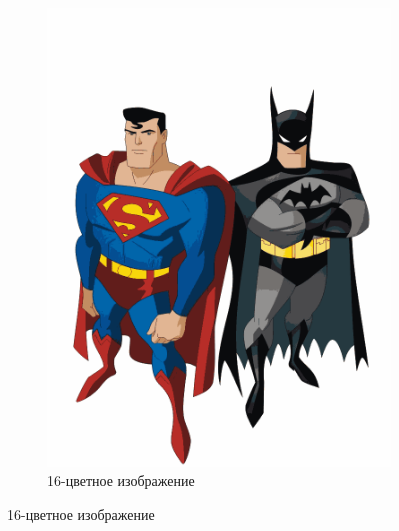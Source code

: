 \documentclass[a4paper,12pt]{article}
\begin{document}
\begin{figure}[htbp]
\begin{subfigure}[b]{0.45\textwidth}
                \includegraphics[width=\textwidth]{images/superman-batman-after}
                \caption{16-цветное изображение}
        \end{subfigure}
\end{figure}
\end{document}
